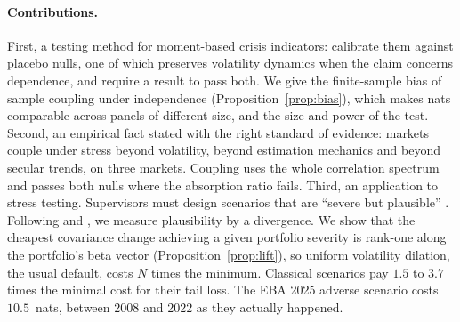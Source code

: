 \documentclass[12pt]{article}
\theoremstyle{definition}
\theoremstyle{remark}
\begin{document}
\begin{doublespace}
\paragraph{Contributions.} First, a testing method for moment-based crisis
indicators: calibrate them against placebo nulls, one of which preserves
volatility dynamics when the claim concerns dependence, and require a result
to pass both. We give
the finite-sample bias of sample coupling under independence
(Proposition~\ref{prop:bias}), which makes nats comparable across panels of
different size, and the size and power of the test. Second, an empirical fact
stated with the right standard of evidence: markets couple under stress beyond
volatility, beyond estimation mechanics and beyond secular trends, on three
markets. Coupling uses the whole correlation spectrum and passes both nulls
where the absorption ratio fails. Third, an application to stress testing.
Supervisors must design scenarios that are ``severe but plausible''
\citep{bcbs2018}. Following \citet{breuer2009,breuer2013} and
\citet{glasserman2014}, we measure plausibility by a divergence. We show that
the cheapest covariance change achieving a given portfolio severity is
rank-one along the portfolio's beta vector (Proposition~\ref{prop:lift}), so
uniform volatility dilation, the usual default, costs $N$ times the minimum.
Classical scenarios pay $1.5$ to $3.7$ times the minimal cost for their tail
loss. The EBA 2025 adverse scenario costs $10.5$~nats, between 2008 and 2022
as they actually happened.


\end{doublespace}
\end{document}
